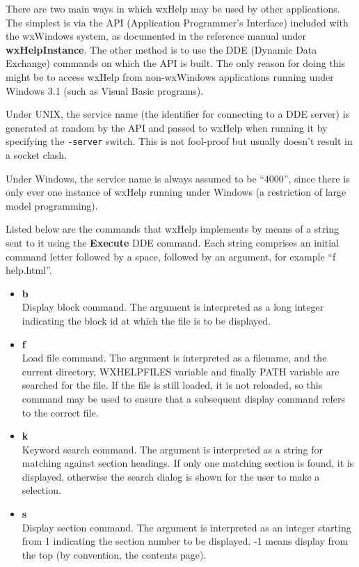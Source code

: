There are two main ways in which wxHelp may be used by other
applications. The simplest is via the API (Application Programmer's
Interface) included with the wxWindows system, as documented in
the reference manual under {\bf wxHelpInstance}. The other method is
to use the DDE (Dynamic Data Exchange) commands on which the API is
built. The only reason for doing this might be to access wxHelp from
non-wxWindows applications running under Windows 3.1 (such as Visual
Basic programs).

Under UNIX, the service name (the identifier for connecting to a DDE
server) is generated at random by the API and passed to wxHelp when
running it by specifying the {\tt -server} switch. This is not fool-proof
but usually doesn't result in a socket clash.

Under Windows, the service name is always assumed to be ``4000'',
since there is only ever one instance of wxHelp running under Windows
(a restriction of large model programming).

Listed below are the commands that wxHelp implements by means of a string
sent to it using the {\bf Execute} DDE command. Each string comprises an initial
command letter followed by a space, followed by an argument, for example
``f help.html''.

\begin{itemize}
\item {\bf b}\\
Display block command. The argument is interpreted as a long integer
indicating the block id at which the file is to be displayed.
\item {\bf f}\\
Load file command. The argument is interpreted as a filename, and the
current directory, WXHELPFILES variable and finally PATH variable are
searched for the file. If the file is still loaded, it is not
reloaded, so this command may be used to ensure that a subsequent
display command refers to the correct file.
\item {\bf k}\\
Keyword search command. The argument is interpreted as a string for matching
against section headings. If only one matching section is found, it is displayed,
otherwise the search dialog is shown for the user to make a selection.
\item {\bf s}\\
Display section command. The argument is interpreted as an integer
starting from 1 indicating the section number to be displayed. -1
means display from the top (by convention, the contents page).
\end{itemize}

